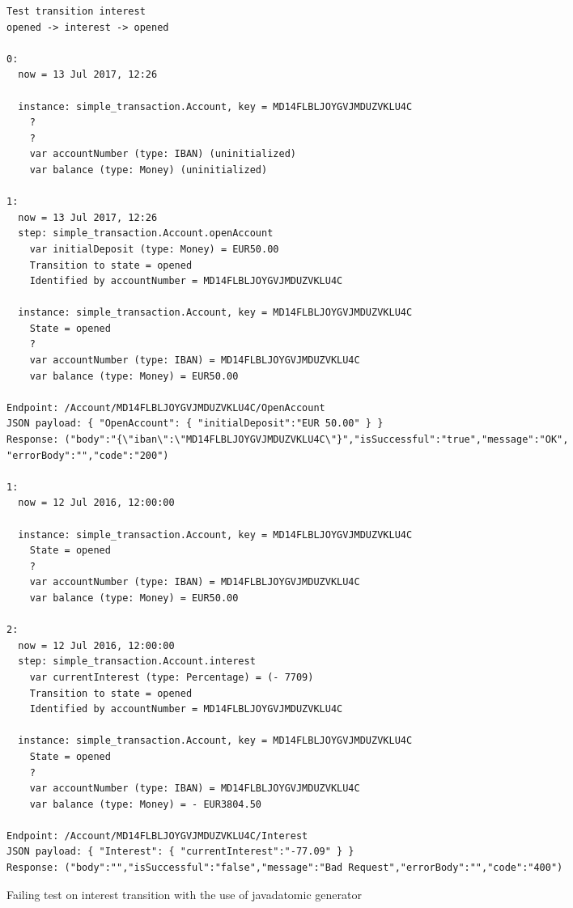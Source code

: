 \begin{sourcecode}[h!]
\begin{lstlisting}[]
Test transition interest
opened -> interest -> opened

0:
  now = 13 Jul 2017, 12:26

  instance: simple_transaction.Account, key = MD14FLBLJOYGVJMDUZVKLU4C
    ?
    ?
    var accountNumber (type: IBAN) (uninitialized)
    var balance (type: Money) (uninitialized)

1:
  now = 13 Jul 2017, 12:26
  step: simple_transaction.Account.openAccount
    var initialDeposit (type: Money) = EUR50.00
    Transition to state = opened
    Identified by accountNumber = MD14FLBLJOYGVJMDUZVKLU4C

  instance: simple_transaction.Account, key = MD14FLBLJOYGVJMDUZVKLU4C
    State = opened
    ?
    var accountNumber (type: IBAN) = MD14FLBLJOYGVJMDUZVKLU4C
    var balance (type: Money) = EUR50.00

Endpoint: /Account/MD14FLBLJOYGVJMDUZVKLU4C/OpenAccount
JSON payload: { "OpenAccount": { "initialDeposit":"EUR 50.00" } }
Response: ("body":"{\"iban\":\"MD14FLBLJOYGVJMDUZVKLU4C\"}","isSuccessful":"true","message":"OK",
"errorBody":"","code":"200")

1:
  now = 12 Jul 2016, 12:00:00

  instance: simple_transaction.Account, key = MD14FLBLJOYGVJMDUZVKLU4C
    State = opened
    ?
    var accountNumber (type: IBAN) = MD14FLBLJOYGVJMDUZVKLU4C
    var balance (type: Money) = EUR50.00

2:
  now = 12 Jul 2016, 12:00:00
  step: simple_transaction.Account.interest
    var currentInterest (type: Percentage) = (- 7709)
    Transition to state = opened
    Identified by accountNumber = MD14FLBLJOYGVJMDUZVKLU4C

  instance: simple_transaction.Account, key = MD14FLBLJOYGVJMDUZVKLU4C
    State = opened
    ?
    var accountNumber (type: IBAN) = MD14FLBLJOYGVJMDUZVKLU4C
    var balance (type: Money) = - EUR3804.50

Endpoint: /Account/MD14FLBLJOYGVJMDUZVKLU4C/Interest
JSON payload: { "Interest": { "currentInterest":"-77.09" } }
Response: ("body":"","isSuccessful":"false","message":"Bad Request","errorBody":"","code":"400")
\end{lstlisting}
\caption{Failing test on interest transition with the use of javadatomic generator}
\label{fig:result-javadatomic-interest}
\end{sourcecode}

